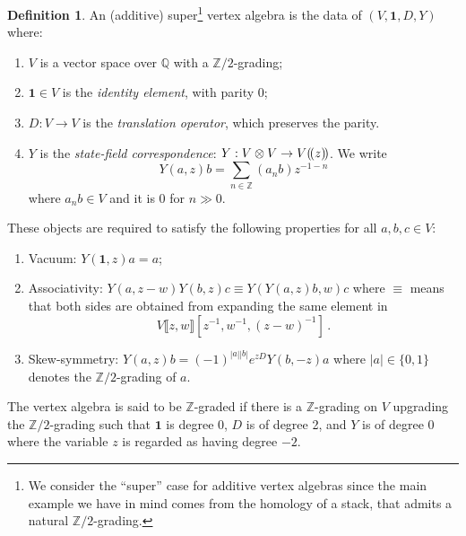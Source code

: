 \documentclass[12pt]{amsart}
\theoremstyle{definition}
\newtheorem{definition}{Definition}[section]
\newcommand{\BQ}{{\mathbb{Q}}}
\newcommand{\BZ}{{\mathbb{Z}}}
\newcommand{\1}{\mathbf 1}
\newcommand{\lpp}{(\hspace{-0.15em}(}
\newcommand{\rpp}{)\hspace{-0.15em})}
\begin{document}
\begin{definition}\label{def: grva} An (additive) super\footnote{We consider the ``super'' case for additive vertex algebras since the main example we have in mind comes from the homology of a stack, that admits a natural $\BZ/2$-grading.} vertex algebra is the data of $(V, \mathbf 1, D, Y)$ where:
\begin{enumerate}[label=(\roman*)]
        \item $V$ is a vector space over $\BQ$ with a $\BZ/2$-grading;
        \item $\mathbf 1 \in V$ is the \textit{identity element}, with parity 0;
        \item $D: V\to V$ is the \textit{translation operator}, which preserves the parity. 
        \item $Y$ is the \textit{state-field correspondence}: $Y: V\otimes V\to V\lpp z\rpp$. We write
        \[Y(a, z)b=\sum_{n\in \BZ}(a_n b)z^{-1-n}\]
        where $a_nb\in V$ and it is 0 for $n\gg 0$.
    \end{enumerate}
    These objects are required to satisfy the following properties for all $a,b, c\in V$: 
    \begin{enumerate}[label=(\roman*)]\label{vertalg}
        \item Vacuum: $Y(\mathbf 1, z) a = a$;
        \item Associativity: $Y(a, z - w)Y(b, z)c \equiv Y(Y(a, z)b, w)c$ where $\equiv$ means that both sides are obtained from expanding the same element in
        \[V\llbracket z, w\rrbracket[z^{-1},w^{-1},(z-w)^{-1}]\,.\]
        \item Skew-symmetry: $Y(a, z)b=(-1)^{|a||b|}e^{zD}Y(b, -z) a$ where $|a|\in \{0,1\}$ denotes the $\BZ/2$-grading of $a$. 
    \end{enumerate}
    The vertex algebra is said to be $\BZ$-graded if there is a $\BZ$-grading on $V$ upgrading the $\BZ/2$-grading such that $\1$ is degree 0, $D$ is of degree 2, and $Y$ is of degree 0 where the variable $z$ is regarded as having degree $-2$.
\end{definition}
\end{document}
